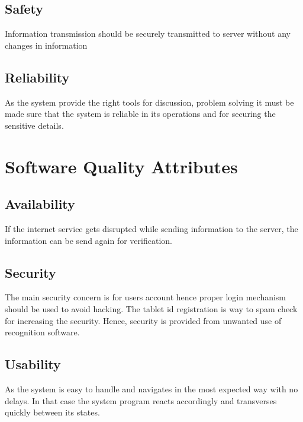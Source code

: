 \documentclass[letterpaper,10pt,english]{sphinxmanual}
\begin{document}
\subsection{Safety}
\label{nonfunc:safety}
Information transmission should be securely transmitted to server without any changes in information


\subsection{Reliability}
\label{nonfunc:reliability}
As the system provide the right tools for discussion, problem solving it must be made sure that the system is reliable in its operations and for securing the sensitive details.


\section{Software Quality Attributes}
\label{nonfunc:software-quality-attributes}

\subsection{Availability}
\label{nonfunc:availability}
If the internet service gets disrupted while sending information to the server, the information can be send again for verification.


\subsection{Security}
\label{nonfunc:security}
The main security concern is for users account hence proper login mechanism should be used to avoid hacking. The tablet id registration is way to spam check for increasing the security. Hence, security is provided from unwanted use of recognition software.


\subsection{Usability}
\label{nonfunc:usability}
As the system is easy to handle and navigates in the most expected way with no delays. In that case the system program reacts accordingly and transverses quickly between its states.
\end{document}
